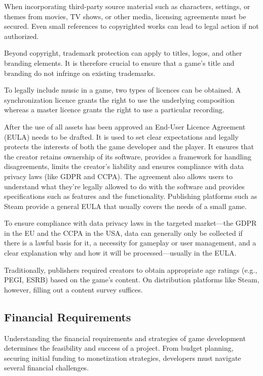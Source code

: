 When incorporating third-party source material such as characters, settings, or themes from movies, TV shows, or other media, licensing agreements must be secured. Even small references to copyrighted works can lead to legal action if not authorized.
\cite{silva_guide-to-release, jd-supra_ip}

Beyond copyright, trademark protection can apply to titles, logos, and other branding elements. It is therefore crucial to ensure that a game’s title and branding do not infringe on existing trademarks.
\cite{dragon_copyright}

To legally include music in a game, two types of licences can be obtained. A synchronization licence grants the right to use the underlying composition whereas a master licence grants the right to use a particular recording.
\cite{iconcollective_music-license}

After the use of all assets has been approved an End-User Licence Agreement (EULA) needs to be drafted\cite{silva_guide-to-release}. It is used to set clear expectations and legally protects the interests of both the game developer and the player. It ensures that the creator retains ownership of its software, provides a framework for handling disagreements, limits the creator’s liability and ensures compliance with data privacy laws (like GDPR and CCPA). The agreement also allows users to understand what they're legally allowed to do with the software and provides specifications such as features and the functionality. Publishing platforms such as Steam provide a general EULA that usually covers the needs of a small game.
\cite{docupilot_eula, steam_content-survey}

To ensure compliance with data privacy laws in the targeted market---the GDPR in the EU and the CCPA in the USA, data can generally only be collected if there is a lawful basis for it, a necessity for gameplay or user management, and a clear explanation why and how it will be processed---usually in the EULA.
\cite{eu_gdpr, doj_ccpa, dentons_eu-data-protection, gamota_data-privacy}

Traditionally, publishers required creators to obtain appropriate age ratings (e.g., PEGI, ESRB) based on the game’s content. On distribution platforms like Steam, however, filling out a content survey suffices.
\cite{steam_content-survey}

\subsection{Financial Requirements}
Understanding the financial requirements and strategies of game development determines the feasibility and success of a project. From budget planning, securing initial funding to monetization strategies, developers must navigate several financial challenges.

